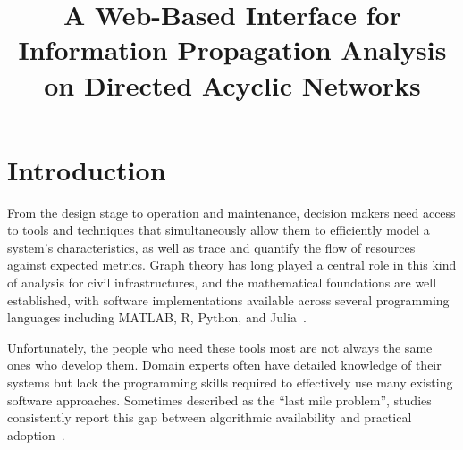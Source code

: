 \documentclass[conference]{IEEEtran}
\begin{document}
\title{A Web-Based Interface for Information Propagation Analysis on Directed Acyclic Networks}

\author{
}

\maketitle

\begin{abstract}
\end{abstract}

\section{Introduction}
From the design stage to operation and maintenance, decision makers need access to tools and techniques that simultaneously allow them to efficiently model a system's characteristics, as well as trace and quantify the flow of resources against expected metrics. Graph theory has long played a central role in this kind of analysis for civil infrastructures, and the mathematical foundations are well established, with software implementations available across several programming languages including MATLAB, R, Python, and Julia~\cite{pearl1988probabilistic, koller2009probabilistic, ferson2015}.

Unfortunately, the people who need these tools most are not always the same ones who develop them. Domain experts often have detailed knowledge of their systems but lack the programming skills required to effectively use many existing software approaches. Sometimes described as the ``last mile problem'', studies consistently report this gap between algorithmic availability and practical adoption~\cite{hannay2009scientists, prabhu2011survey}.
\end{document}
